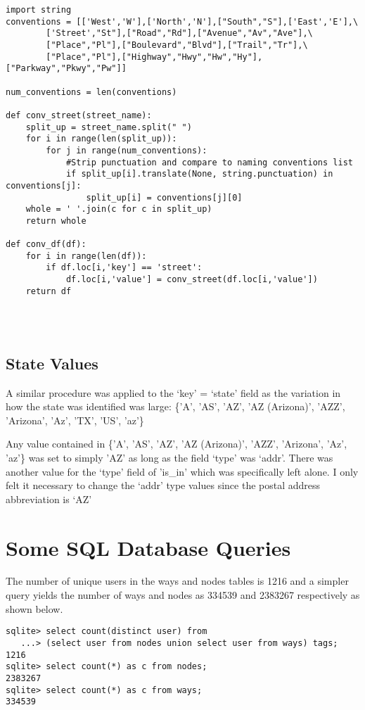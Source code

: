 \documentclass{article}
\begin{document}
\begin{verbatim}
import string
conventions = [['West','W'],['North','N'],["South","S"],['East','E'],\
		['Street',"St"],["Road","Rd"],["Avenue","Av","Ave"],\
		["Place","Pl"],["Boulevard","Blvd"],["Trail","Tr"],\
		["Place","Pl"],["Highway","Hwy","Hw","Hy"],["Parkway","Pkwy","Pw"]]
		
num_conventions = len(conventions)

def conv_street(street_name):
    split_up = street_name.split(" ")
    for i in range(len(split_up)):
        for j in range(num_conventions):
            #Strip punctuation and compare to naming conventions list
            if split_up[i].translate(None, string.punctuation) in conventions[j]:
                split_up[i] = conventions[j][0]
    whole = ' '.join(c for c in split_up)
    return whole

def conv_df(df):
    for i in range(len(df)):
        if df.loc[i,'key'] == 'street':
            df.loc[i,'value'] = conv_street(df.loc[i,'value'])
    return df
    
   
    
\end{verbatim}

\subsection{State Values}
A similar procedure was applied to the `key' = `state' field as the variation in how the state was identified was large: \{'A', 'AS', 'AZ', 'AZ (Arizona)', 'AZZ', 'Arizona', 'Az', 'TX', 'US', 'az'\}

Any value contained in \{'A', 'AS', 'AZ', 'AZ (Arizona)', 'AZZ', 'Arizona', 'Az', 'az'\} was set to simply 'AZ' as long as the field `type' was `addr'.  There was another value for the `type' field of 'is\_in' which was specifically left alone.  I only felt it necessary to change the `addr' type values since the postal address abbreviation is `AZ'

\section{Some SQL Database Queries}
The number of unique users in the ways and nodes tables is 1216 and a simpler query yields the number of ways and nodes as 334539 and 2383267 respectively as shown below.

\begin{verbatim}
sqlite> select count(distinct user) from
   ...> (select user from nodes union select user from ways) tags;
1216
sqlite> select count(*) as c from nodes;
2383267
sqlite> select count(*) as c from ways;
334539


\end{verbatim}
\end{document}
